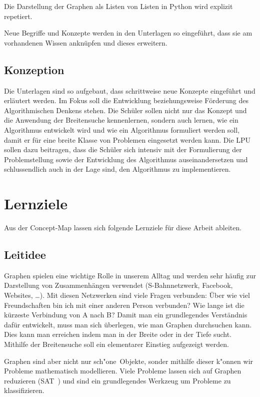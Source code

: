 Die Darstellung der Graphen als Listen von Listen in Python wird explizit repetiert.


Neue Begriffe und Konzepte werden in den Unterlagen so eingef\"uhrt, dass sie am vorhandenen Wissen ankn\"upfen und dieses erweitern.

\subsection{Konzeption}
Die Unterlagen sind so aufgebaut, dass schrittweise neue Konzepte eingef\"uhrt und erl\"autert werden. Im Fokus soll die Entwicklung beziehungsweise F\"orderung des Algorithmischen Denkens stehen. Die Sch\"uler sollen nicht nur das Konzept und die Anwendung der Breitensuche kennenlernen, sondern auch lernen, wie ein Algorithmus entwickelt wird und wie ein Algorithmus formuliert werden soll, damit er f\"ur eine breite Klasse von Problemen eingesetzt werden kann. Die LPU sollen dazu beitragen, dass die Sch\"uler sich intensiv mit der Formulierung der Problemstellung sowie der Entwicklung des Algorithmus auseinandersetzen und schlussendlich auch in der Lage sind, den Algorithmus zu implementieren.


\section{Lernziele}

Aus der Concept-Map lassen sich folgende Lernziele für diese Arbeit ableiten. 

\subsection{Leitidee}

Graphen spielen eine wichtige Rolle in unserem Alltag und werden sehr häufig zur Darstellung von Zusammenhängen verwendet (S-Bahnnetzwerk, Facebook, Websites, \dots). 
Mit diesen Netzwerken sind viele Fragen verbunden: Über wie viel Freundschaften bin ich mit einer anderen Person verbunden? Wie lange ist die kürzeste Verbindung von A nach B?
Damit man ein grundlegendes Verständnis dafür entwickelt, muss man sich überlegen, wie man Graphen durchsuchen kann. 
Dies kann man erreichen indem man in der Breite oder in der Tiefe sucht. 
Mithilfe der Breitensuche soll ein elementarer Einstieg aufgezeigt werden. 

Graphen sind aber nicht nur \glqq sch"one\grqq\ Objekte, sonder mithilfe dieser k"onnen wir Probleme mathematisch modellieren. 
Viele Probleme lassen sich auf Graphen reduzieren (SAT~\cite{hrom1}) und sind ein grundlegendes Werkzeug um Probleme zu klassifizieren. 


